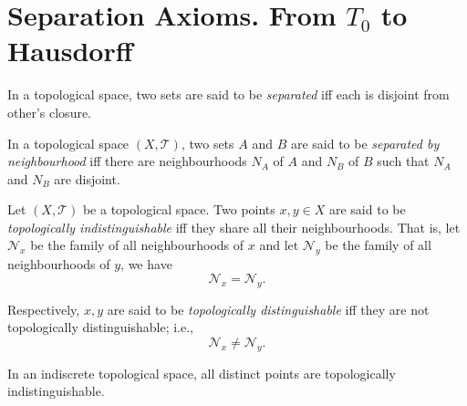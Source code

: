 \section{Separation Axioms. From $T_0$ to Hausdorff}





\begin{definition}
	[saperated]
	\label{def: seperated}
	In a topological space, two sets are said to be \textit{separated} iff each is disjoint from other's closure.
\end{definition}


\begin{definition}
	\label{def: separated by neighbourhoods}
	In a topological space $(X, \mathcal T)$, two sets $A$ and $B$ are said to be \textit{separated by neighbourhood} iff there are neighbourhoods $N_A$ of $A$ and $N_B$ of $B$ such that $N_A$ and $N_B$ are disjoint.
\end{definition}


\begin{definition}
	\label{def: topologically indistinguishable}
	Let $(X, \mathcal T)$ be a topological space. Two points $x,y \in X$ are said to be \textit{topologically indistinguishable} iff they share all their neighbourhoods. That is, let $\mathcal N_x$ be the family of all neighbourhoods of $x$ and let $\mathcal N_y$ be the family of all neighbourhoods of $y$, we have
	$$
	\mathcal N_x = \mathcal N_y.
	$$
	
	Respectively, $x,y$ are said to be \textit{topologically distinguishable} iff they are not topologically distinguishable; i.e.,
	$$
	\mathcal N_x \ne \mathcal N_y.
	$$
\end{definition}


\begin{example}
	In an indiscrete topological space, all distinct points are topologically indistinguishable.
\end{example}


